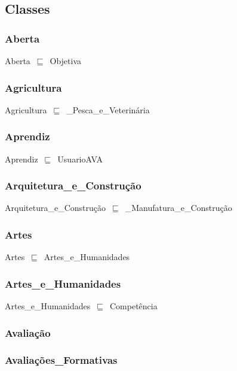 \documentclass{article}
\begin{document}
\subsection*{Classes}

\subsubsection*{Aberta}

Aberta~\ensuremath{\sqsubseteq}~Objetiva~

\subsubsection*{Agricultura}

Agricultura~\ensuremath{\sqsubseteq}~\_Pesca\_e\_Veterinária~

\subsubsection*{Aprendiz}

Aprendiz~\ensuremath{\sqsubseteq}~UsuarioAVA~

\subsubsection*{Arquitetura\_e\_Construção}

Arquitetura\_e\_Construção~\ensuremath{\sqsubseteq}~\_Manufatura\_e\_Construção~

\subsubsection*{Artes}

Artes~\ensuremath{\sqsubseteq}~Artes\_e\_Humanidades~

\subsubsection*{Artes\_e\_Humanidades}

Artes\_e\_Humanidades~\ensuremath{\sqsubseteq}~Competência~

\subsubsection*{Avaliação}

\subsubsection*{Avaliações\_Formativas}
\end{document}
